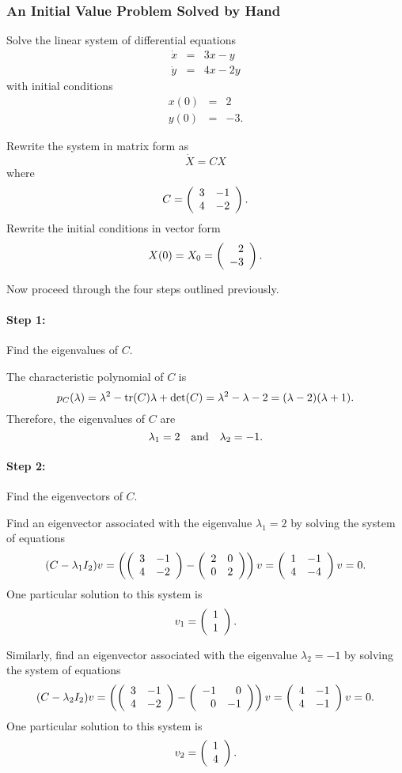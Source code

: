 \subsubsection*{An Initial Value Problem Solved by Hand}

Solve the linear system of differential equations
\begin{equation}  \label{E:ivpbh}
\begin{array}{rcl}
\dot{x} & = & 3x-y \\
\dot{y} & = & 4x-2y \end{array}
\end{equation}
with initial conditions
\begin{equation}  \label{E:ivpbhic}
\begin{array}{rcc}
 x(0) & = & 2 \\
 y(0) & = & -3.
\end{array}
\end{equation}

Rewrite the system  in matrix form as
\[
\dot{X} = CX
\]
where
\[
C = \left(\begin{array}{rr} 3 & -1\\ 4 &-2\end{array}\right).
\]
Rewrite the initial conditions  in vector form
\[
X(0) = X_0 = \left(\begin{array}{r} 2 \\ -3\end{array}\right).
\]

Now proceed through the four steps outlined previously.

\paragraph{Step 1:}  Find the eigenvalues of $C$.

The characteristic polynomial of $C$ is
\[
p_C(\lambda) = \lambda^2 -{\rm tr}(C)\lambda+\det(C) = \lambda^2-\lambda-2
= (\lambda-2)(\lambda+1).
\]
Therefore, the eigenvalues of $C$ are
\[
\lambda_1 = 2 \quad\mbox{and}\quad \lambda_2=-1.
\]

\paragraph{Step 2:}  Find the eigenvectors of $C$.

Find an eigenvector associated with the eigenvalue $\lambda_1 = 2$
by solving the system of equations
\[
(C-\lambda_1I_2)v = \left(\left(\begin{array}{rr} 3 & -1\\ 4 &-2\end{array}\right)-\left(\begin{array}{rr} 2 & 0\\ 0 &2\end{array}\right)\right)v
= \left(\begin{array}{rr} 1 & -1\\ 4 &-4\end{array}\right)v = 0.
\]
One particular solution to this system is
\[
v_1 = \left(\begin{array}{r} 1 \\ 1\end{array}\right).
\]

Similarly, find an eigenvector associated with the eigenvalue
$\lambda_2 = -1$ by solving the system of equations
\[
(C-\lambda_2I_2)v = \left(\left(\begin{array}{rr} 3 & -1\\ 4 &-2\end{array}\right)-\left(\begin{array}{rr} -1 & 0\\ 0 &-1\end{array}\right)\right)v
= \left(\begin{array}{rr} 4 & -1\\ 4 &-1\end{array}\right)v = 0.
\]
One particular solution to this system is
\[
v_2 = \left(\begin{array}{r} 1 \\ 4\end{array}\right).
\]

